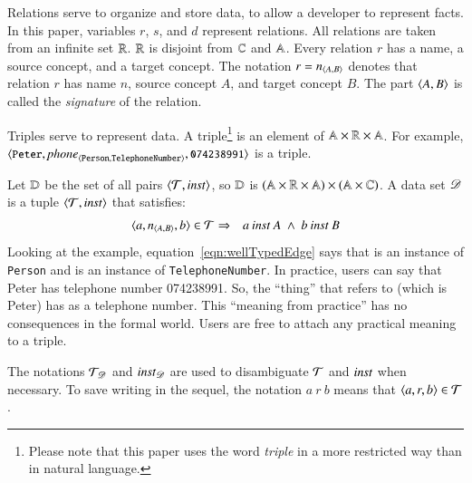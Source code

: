 \documentclass{elsarticle}
\begin{document}
   Relations serve to organize and store data, to allow a developer to represent facts.
   In this paper, variables $r$, $s$, and $d$ represent relations.
   All relations are taken from an infinite set $\mathbb{R}$.
   $\mathbb{R}$ is disjoint from $\mathbb{C}$ and $\mathbb{A}$.
   Every relation $r$ has a name, a source concept, and a target concept.
   The notation $r=\text{\it n\/}_{\langle{A},{B}\rangle}$ denotes that relation $r$ has name $n$, source concept $A$, and target concept $B$.
   The part $\langle{A},{B}\rangle$ is called the {\em signature} of the relation.


   Triples serve to represent data.
   A triple\footnote{Please note that this paper uses the word {\em triple} in a more restricted way than in natural language.}
   is an element of $\mathbb{A}\times\mathbb{R}\times\mathbb{A}$.
   For example, $\langle{\text{{\tt\small Peter}}},{\text{\it \text{\it phone\/}\/}_{\langle{\tt Person},{\tt TelephoneNumber}\rangle}},{\text{{\tt\small 074238991}}}\rangle$ is a triple.

   Let $\mathbb{D}$ be the set of all pairs $\langle{\mathcal{T}},{\mathbin{\text{\it inst\/}}}\rangle$, so
   $\mathbb{D}$ is $(\mathbb{A}\times\mathbb{R}\times\mathbb{A})\times(\mathbb{A}\times\mathbb{C})$.
   A data set $\mathscr{D}$ is a tuple $\langle{\mathcal{T}},{\mathbin{\text{\it inst\/}}}\rangle$ that satisfies:
\begin{eqnarray}
   \langle{a},{\text{\it n\/}_{\langle{A},{B}\rangle}},{b}\rangle\in\mathcal{T}&\Rightarrow&a\mathbin{\text{\it inst\/}} A\ \wedge\ b\mathbin{\text{\it inst\/}} B
   \label{eqn:wellTypedEdge}
\end{eqnarray}
   Looking at the example,
   equation~\ref{eqn:wellTypedEdge} says that  is an instance of {\tt Person} and  is an instance of {\tt TelephoneNumber}.
   In practice, users can say that Peter has telephone number 074238991.
   So, the ``thing'' that  refers to (which is Peter) has  as a telephone number.
   This ``meaning from practice'' has no consequences in the formal world.
   Users are free to attach any practical meaning to a triple.

   The notations $\mathcal{T}_{\mathscr{D}}$ and $\mathbin{\text{\it inst\/}}_{\mathscr{D}}$ are used to disambiguate $\mathcal{T}$ and $\mathbin{\text{\it inst\/}}$ when necessary.
   To save writing in the sequel, the notation $a\ r\ b$ means that $\langle{a},{r},{b}\rangle\in\mathcal{T}$.
\end{document}
